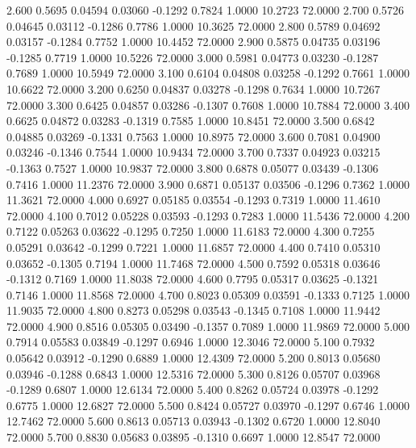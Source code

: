    2.600   0.5695   0.04594   0.03060  -0.1292   0.7824   1.0000  10.2723  72.0000
   2.700   0.5726   0.04645   0.03112  -0.1286   0.7786   1.0000  10.3625  72.0000
   2.800   0.5789   0.04692   0.03157  -0.1284   0.7752   1.0000  10.4452  72.0000
   2.900   0.5875   0.04735   0.03196  -0.1285   0.7719   1.0000  10.5226  72.0000
   3.000   0.5981   0.04773   0.03230  -0.1287   0.7689   1.0000  10.5949  72.0000
   3.100   0.6104   0.04808   0.03258  -0.1292   0.7661   1.0000  10.6622  72.0000
   3.200   0.6250   0.04837   0.03278  -0.1298   0.7634   1.0000  10.7267  72.0000
   3.300   0.6425   0.04857   0.03286  -0.1307   0.7608   1.0000  10.7884  72.0000
   3.400   0.6625   0.04872   0.03283  -0.1319   0.7585   1.0000  10.8451  72.0000
   3.500   0.6842   0.04885   0.03269  -0.1331   0.7563   1.0000  10.8975  72.0000
   3.600   0.7081   0.04900   0.03246  -0.1346   0.7544   1.0000  10.9434  72.0000
   3.700   0.7337   0.04923   0.03215  -0.1363   0.7527   1.0000  10.9837  72.0000
   3.800   0.6878   0.05077   0.03439  -0.1306   0.7416   1.0000  11.2376  72.0000
   3.900   0.6871   0.05137   0.03506  -0.1296   0.7362   1.0000  11.3621  72.0000
   4.000   0.6927   0.05185   0.03554  -0.1293   0.7319   1.0000  11.4610  72.0000
   4.100   0.7012   0.05228   0.03593  -0.1293   0.7283   1.0000  11.5436  72.0000
   4.200   0.7122   0.05263   0.03622  -0.1295   0.7250   1.0000  11.6183  72.0000
   4.300   0.7255   0.05291   0.03642  -0.1299   0.7221   1.0000  11.6857  72.0000
   4.400   0.7410   0.05310   0.03652  -0.1305   0.7194   1.0000  11.7468  72.0000
   4.500   0.7592   0.05318   0.03646  -0.1312   0.7169   1.0000  11.8038  72.0000
   4.600   0.7795   0.05317   0.03625  -0.1321   0.7146   1.0000  11.8568  72.0000
   4.700   0.8023   0.05309   0.03591  -0.1333   0.7125   1.0000  11.9035  72.0000
   4.800   0.8273   0.05298   0.03543  -0.1345   0.7108   1.0000  11.9442  72.0000
   4.900   0.8516   0.05305   0.03490  -0.1357   0.7089   1.0000  11.9869  72.0000
   5.000   0.7914   0.05583   0.03849  -0.1297   0.6946   1.0000  12.3046  72.0000
   5.100   0.7932   0.05642   0.03912  -0.1290   0.6889   1.0000  12.4309  72.0000
   5.200   0.8013   0.05680   0.03946  -0.1288   0.6843   1.0000  12.5316  72.0000
   5.300   0.8126   0.05707   0.03968  -0.1289   0.6807   1.0000  12.6134  72.0000
   5.400   0.8262   0.05724   0.03978  -0.1292   0.6775   1.0000  12.6827  72.0000
   5.500   0.8424   0.05727   0.03970  -0.1297   0.6746   1.0000  12.7462  72.0000
   5.600   0.8613   0.05713   0.03943  -0.1302   0.6720   1.0000  12.8040  72.0000
   5.700   0.8830   0.05683   0.03895  -0.1310   0.6697   1.0000  12.8547  72.0000
